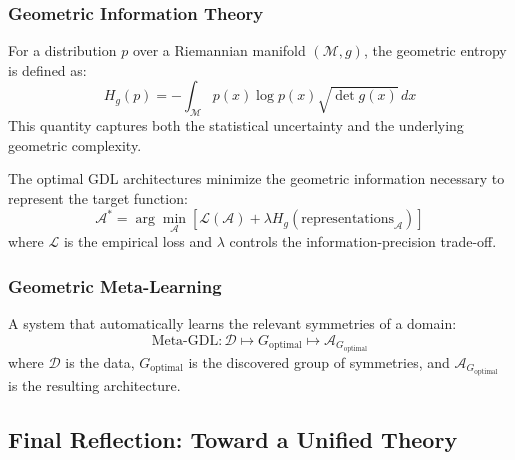 \subsubsection{Geometric Information Theory}

\begin{definition}\label{def:entropia_geometrica_fisher}
For a distribution $p$ over a Riemannian manifold $(\mathcal{M}, g)$, the geometric entropy is defined as:
\begin{equation}
    H_g(p) = -\int_\mathcal{M} p(x) \log p(x) \sqrt{\det g(x)} \, dx
\end{equation}
This quantity captures both the statistical uncertainty and the underlying geometric complexity.
\end{definition}

\begin{conjecture}\label{conj:principio_informacion_minima}
The optimal GDL architectures minimize the geometric information necessary to represent the target function:
\begin{equation}
    \mathcal{A}^* = \arg\min_\mathcal{A} \left[ \mathcal{L}(\mathcal{A}) + \lambda H_g(\text{representations}_\mathcal{A}) \right]
\end{equation}
where $\mathcal{L}$ is the empirical loss and $\lambda$ controls the information-precision trade-off.
\end{conjecture}

\subsubsection{Geometric Meta-Learning}

\begin{definition}\label{def:meta_learner_geometrico}
A system that automatically learns the relevant symmetries of a domain:
\begin{equation}
    \text{Meta-GDL}: \mathcal{D} \mapsto G_{\text{optimal}} \mapsto \mathcal{A}_{G_{\text{optimal}}}
\end{equation}
where $\mathcal{D}$ is the data, $G_{\text{optimal}}$ is the discovered group of symmetries, and $\mathcal{A}_{G_{\text{optimal}}}$ is the resulting architecture.
\end{definition}

\subsection{Final Reflection: Toward a Unified Theory}\label{subsec:reflexion_final}

